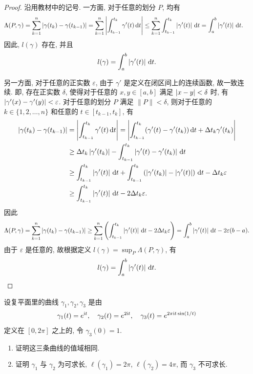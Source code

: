\documentclass{article}
\begin{document}
\begin{proof}
  沿用教材中的记号. 一方面, 对于任意的划分 \( P \), 均有
  \begin{align*}
    \Lambda(P,\gamma)
    &=\sum_{k=1}^{n} \left|\gamma(t_k)-\gamma(t_{k-1})\right|
    =\sum_{k=1}^{n} \left|\int_{t_{k-1}}^{t_k} \gamma'(t)\,\mathrm{d} t\right|
    \leq \sum_{k=1}^{n} \int_{t_{k-1}}^{t_k} \left|\gamma'(t)\right|\,\mathrm{d} t
    =\int_a^b \left|\gamma'(t)\right|\,\mathrm{d} t.
  \end{align*}
  因此, \( l(\gamma) \) 存在, 并且
  \[ l(\gamma) = \int_a^b \left|\gamma'(t)\right|\,\mathrm{d} t. \]

  另一方面, 对于任意的正实数 \( \varepsilon \), 由于 \( \gamma' \) 是定义在闭区间上的连续函数, 故一致连续. 即, 存在正实数 \( \delta \), 使得对于任意的 \( x,y\in[a,b] \) 满足 \( \left|x-y\right|<\delta \) 时, 有 \( \left|\gamma'(x)-\gamma'(y)\right|<\varepsilon \). 对于任意的划分 \( P \) 满足 \( \|P\|<\delta \), 则对于任意的 \( k\in\{1,2,\dots,n\} \) 和任意的 \( t\in[t_{k-1},t_k] \), 有
  \begin{align*}
    \left|\gamma(t_{k})-\gamma(t_{k-1})\right|
    &=\left|\int_{t_{k-1}}^{t_k} \gamma'(t)\,\mathrm{d} t\right|
    =\left|\int_{t_{k-1}}^{t_k} (\gamma'(t)-\gamma'(t_{k}))\,\mathrm{d} t + \Delta t_k \gamma'(t_{k})\right| \\
    &\geq \Delta t_k \left|\gamma'(t_{k})\right| - \int_{t_{k-1}}^{t_k} \left|\gamma'(t)-\gamma'(t_{k})\right|\,\mathrm{d} t \\
    &\geq \int_{t_{k-1}}^{t_k} \left|\gamma'(t)\right| \,\mathrm{d} t + \int_{t_{k-1}}^{t_k}\left( \left|\gamma'(t_k)\right|-\left|\gamma'(t)\right| \right) \,\mathrm{d} t - \Delta t_k \varepsilon \\
    &\geq \int_{t_{k-1}}^{t_k} \left|\gamma'(t)\right| \,\mathrm{d} t -2 \Delta t_k \varepsilon.
  \end{align*}
  因此
  \[ \Lambda(P,\gamma)
  = \sum_{k=1}^{n}\left|\gamma(t_k)-\gamma(t_{k-1})\right|
  \geq \sum_{k=1}^{n}\left( \int_{t_{k-1}}^{t_k} \left|\gamma'(t)\right| \,\mathrm{d} t -2 \Delta t_k \varepsilon \right)
  =\int_{a}^{b} \left|\gamma'(t)\right|\,\mathrm{d} t - 2\varepsilon(b-a).
  \]
  由于 \( \varepsilon \) 是任意的, 故根据定义 \( l(\gamma)=\sup_{P}\Lambda(P,\gamma) \), 有
  \[ l(\gamma) = \int_a^b \left|\gamma'(t)\right|\,\mathrm{d} t. \]
\end{proof}



\begin{problem}
设复平面里的曲线 $\gamma_1,\gamma_2,\gamma_3$ 是由
\[
\gamma_1(t)=e^{\mathrm{i} t},\quad \gamma_2(t)=e^{2\mathrm{i} t},\quad \gamma_3(t)=e^{2\pi \mathrm{i} t\sin(1/t)}
\]
定义在 $[0,2\pi]$ 之上的, 令 $\gamma_3(0)=1$.
\begin{enumerate}[label=(\alph*)]
\item 证明这三条曲线的值域相同.
\item 证明 $\gamma_1$ 与 $\gamma_2$ 为可求长, $\ell(\gamma_1)=2\pi$, $\ell(\gamma_2)=4\pi$, 而 $\gamma_3$ 不可求长.
\end{enumerate}
\end{problem}
\end{document}
